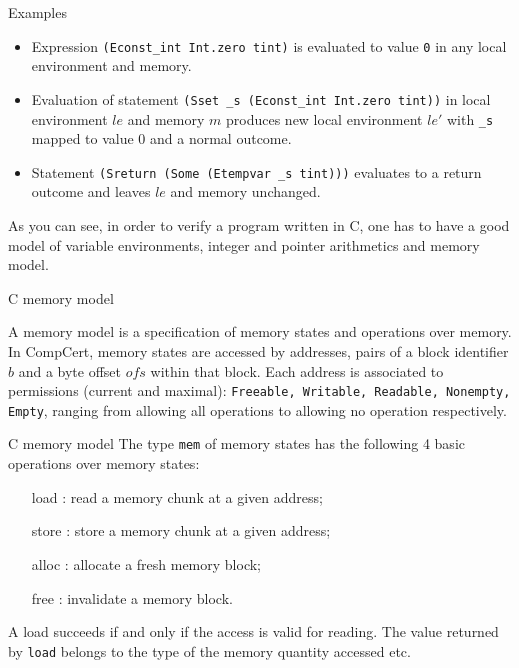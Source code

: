\documentclass[10pt]{beamer}
\begin{document}
\begin{frame}{Examples}
    \begin{itemize}
      \item Expression \texttt{(Econst\_int Int.zero tint)} is evaluated to value \texttt{0} in any local environment and memory.

   \item Evaluation of statement \texttt{(Sset \_s (Econst\_int Int.zero tint))} in local environment $le$ and memory $m$ produces new local environment $le'$ with \texttt{\_s} mapped to value $0$ and a normal outcome.

   \item Statement \texttt{(Sreturn (Some (Etempvar \_s tint)))} evaluates to a return outcome and leaves $le$ and memory unchanged.

     \end{itemize}

    As you can see, in order to verify a program written in C, one has to have a good model of variable environments, integer and pointer arithmetics and memory model. 

\end{frame}
   
\begin{frame}[fragile]{C memory model}

    A memory model is a specification of memory states and operations over memory. In CompCert,
   memory states are accessed by addresses, pairs of a block
  identifier $b$ and a byte offset $ofs$ within that block.
  Each address is associated to permissions (current and maximal): \texttt{Freeable, Writable, Readable, Nonempty, Empty}, ranging from allowing all operations to allowing no operation respectively.
\end{frame}


\begin{frame}{C memory model}
  The type \texttt{mem} of memory states has  the following 4 basic operations over memory states:
  \bigskip
  
\begin{itemize}
\item [load]: read a memory chunk at a given address;
\item [store]: store a memory chunk at a given address;
\item [alloc]: allocate a fresh memory block;
\item [free]: invalidate a memory block.
\end{itemize}
\bigskip
A load succeeds if and only if the access is valid for reading. The value returned by \texttt{load} belongs to the type of the memory quantity accessed etc. 



\end{frame}
\end{document}
